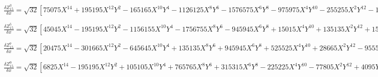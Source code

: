 \documentclass[10pt,landscape]{article}
\begin{document}
\vspace{1.2 mm}
\noindent $ \frac{\delta Z^{3}_{15}}{\delta x} = \sqrt{32} [75075X^{14} +195195X^{12}Y^{2} -165165X^{10}Y^{4} -1126125X^{8}Y^{6} -1576575X^{6}Y^{8} -975975X^{4}Y^{10} -255255X^{2}Y^{12} -15015Y^{14} -234234X^{12} -396396X^{10}Y^{2} +810810X^{8}Y^{4} +2522520X^{6}Y^{6} +2252250X^{4}Y^{8} +756756X^{2}Y^{10} +54054Y^{12} +283140X^{10} +231660X^{8}Y^{2} -1081080X^{6}Y^{4} -1801800X^{4}Y^{6} -849420X^{2}Y^{8} -77220Y^{10} -166320X^{8} +554400X^{4}Y^{4} +443520X^{2}Y^{6} +55440Y^{8} +48510X^{6} -34650X^{4}Y^{2} -103950X^{2}Y^{4} -20790Y^{6} -6300X^{4} +7560X^{2}Y^{2} +3780Y^{4} +252X^{2} -252Y^{2}] $

\vspace{1.2 mm}
\noindent $ \frac{\delta Z^{5}_{15}}{\delta x} = \sqrt{32} [45045X^{14} -195195X^{12}Y^{2} -1156155X^{10}Y^{4} -1756755X^{8}Y^{6} -945945X^{6}Y^{8} +15015X^{4}Y^{10} +135135X^{2}Y^{12} +15015Y^{14} -130130X^{12} +660660X^{10}Y^{2} +2612610X^{8}Y^{4} +2522520X^{6}Y^{6} +450450X^{4}Y^{8} -300300X^{2}Y^{10} -50050Y^{12} +141570X^{10} -810810X^{8}Y^{2} -1981980X^{6}Y^{4} -900900X^{4}Y^{6} +193050X^{2}Y^{8} +64350Y^{10} -71280X^{8} +443520X^{6}Y^{2} +554400X^{4}Y^{4} -39600Y^{8} +16170X^{6} -103950X^{4}Y^{2} -34650X^{2}Y^{4} +11550Y^{6} -1260X^{4} +7560X^{2}Y^{2} -1260Y^{4}] $

\vspace{1.2 mm}
\noindent $ \frac{\delta Z^{7}_{15}}{\delta x} = \sqrt{32} [20475X^{14} -301665X^{12}Y^{2} -645645X^{10}Y^{4} +135135X^{8}Y^{6} +945945X^{6}Y^{8} +525525X^{4}Y^{10} +28665X^{2}Y^{12} -9555Y^{14} -52052X^{12} +792792X^{10}Y^{2} +900900X^{8}Y^{4} -1009008X^{6}Y^{6} -1261260X^{4}Y^{8} -168168X^{2}Y^{10} +28028Y^{12} +47190X^{10} -733590X^{8}Y^{2} -180180X^{6}Y^{4} +900900X^{4}Y^{6} +270270X^{2}Y^{8} -30030Y^{10} -17820X^{8} +277200X^{6}Y^{2} -138600X^{4}Y^{4} -166320X^{2}Y^{6} +13860Y^{8} +2310X^{6} -34650X^{4}Y^{2} +34650X^{2}Y^{4} -2310Y^{6}] $

\vspace{1.2 mm}
\noindent $ \frac{\delta Z^{9}_{15}}{\delta x} = \sqrt{32} [6825X^{14} -195195X^{12}Y^{2} +105105X^{10}Y^{4} +765765X^{8}Y^{6} +315315X^{6}Y^{8} -225225X^{4}Y^{10} -77805X^{2}Y^{12} +4095Y^{14} -14196X^{12} +408408X^{10}Y^{2} -540540X^{8}Y^{4} -1009008X^{6}Y^{6} +180180X^{4}Y^{8} +216216X^{2}Y^{10} -9828Y^{12} +9438X^{10} -270270X^{8}Y^{2} +540540X^{6}Y^{4} +180180X^{4}Y^{6} -193050X^{2}Y^{8} +7722Y^{10} -1980X^{8} +55440X^{6}Y^{2} -138600X^{4}Y^{4} +55440X^{2}Y^{6} -1980Y^{8}] $
\end{document}
